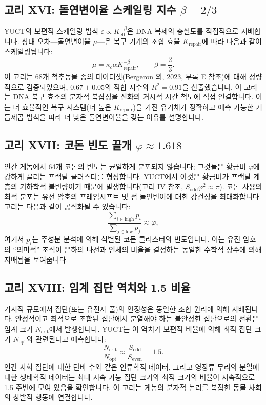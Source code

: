\documentclass[11pt,a4paper]{article}
\newcommand{\Keff}{K_{\mathrm{eff}}}
\newcommand{\Sodd}{S_{\mathrm{odd}}}
\newcommand{\Seven}{S_{\mathrm{even}}}
\begin{document}
	\subsection{고리 XVI: 돌연변이율 스케일링 지수 \(\beta = 2/3\)}
	
	YUCT의 보편적 스케일링 법칙 \(\varepsilon \propto \Keff^{-\beta}\)은 DNA 복제의 충실도를 직접적으로 지배합니다. 상대 오차—돌연변이율 \(\mu\)—은 복구 기계의 조합 효율 \(K_{\mathrm{repair}}\)에 따라 다음과 같이 스케일링됩니다:
	\begin{equation}
		\boxed{ \mu = \kappa_c \alpha K_{\mathrm{repair}}^{-\beta}, \qquad \beta = \frac{2}{3} }.
	\end{equation}
	이 고리는 68개 척추동물 종의 데이터셋(Bergeron 외, 2023, 부록 E 참조)에 대해 정량적으로 검증되었으며, \(0.67 \pm 0.05\)의 적합 지수와 \(R^2 = 0.91\)을 산출했습니다. 이 고리는 DNA 복구 효소의 분자적 복잡성을 진화의 거시적 시간 척도에 직접 연결합니다. 이는 더 효율적인 복구 시스템(더 높은 \(K_{\mathrm{repair}}\))을 가진 유기체가 정확하고 예측 가능한 거듭제곱 법칙을 따라 더 낮은 돌연변이율을 갖는 이유를 설명합니다.
	
	\subsection{고리 XVII: 코돈 빈도 끌개 \(\varphi \approx 1.618\)}
	
	인간 게놈에서 64개 코돈의 빈도는 균일하게 분포되지 않습니다; 그것들은 황금비 \(\varphi\)에 강하게 끌리는 프랙탈 클러스터를 형성합니다. YUCT에서 이것은 황금비가 프랙탈 계층의 기하학적 불변량이기 때문에 발생합니다(고리 IV 참조, \(\Sodd\varphi^2 \approx \pi\)). 코돈 사용의 최적 분포는 유전 암호의 프레임시프트 및 점 돌연변이에 대한 강건성을 최대화합니다. 고리는 다음과 같이 공식화될 수 있습니다:
	\begin{equation}
		\boxed{ \frac{\sum_{i \in \text{high}} p_i}{\sum_{j \in \text{low}} p_j} \approx \varphi },
	\end{equation}
	여기서 \(p_i\)는 주성분 분석에 의해 식별된 코돈 클러스터의 빈도입니다. 이는 유전 암호의 ``의미적'' 조직이 은하의 나선과 인체의 비율을 결정하는 동일한 수학적 상수에 의해 지배됨을 보여줍니다.
	
	\subsection{고리 XVIII: 임계 집단 역치와 1.5 비율}
	
	거시적 규모에서 집단(또는 유전자 풀)의 안정성은 동일한 조합 원리에 의해 지배됩니다. 안정적이고 최적으로 조합된 집단에서 분열해야 하는 불안정한 집단으로의 전환은 임계 크기 \(N_{\mathrm{crit}}\)에서 발생합니다. YUCT는 이 역치가 보편적 비율에 의해 최적 집단 크기 \(N_{\mathrm{opt}}\)와 관련된다고 예측합니다:
	\begin{equation}
		\boxed{ \frac{N_{\mathrm{crit}}}{N_{\mathrm{opt}}} \approx \frac{\Sodd}{\Seven} = 1.5 }.
	\end{equation}
	인간 사회 집단에 대한 던바 수와 같은 인류학적 데이터, 그리고 영장류 무리의 분열에 대한 생태학적 데이터는 최대 지속 가능 집단 크기와 최적 크기의 비율이 지속적으로 1.5 주변에 모여 있음을 확인합니다. 이 고리는 게놈의 분자적 논리를 복잡한 동물 사회의 창발적 행동에 연결합니다.
	
\end{document}
